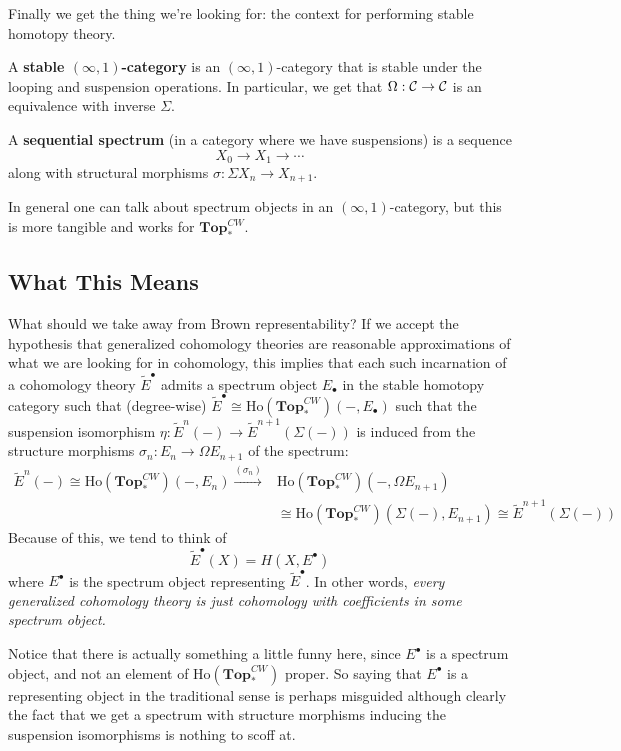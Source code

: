 \documentclass[12pt]{article}
\newcommand*{\pCW}{\mathbf{Top}^{CW}_\ast}
\begin{document}
Finally we get the thing we're looking for: the context for performing stable homotopy theory.
\begin{defn}
	A \textbf{stable $(\infty,1)$-category} is an $(\infty,1)$-category that is stable under the looping and suspension operations. In particular, 
	we get that $\Omega:\mathcal{C}\to\mathcal{C}$ is an equivalence with inverse $\Sigma.$
\end{defn}
\begin{defn}
	A \textbf{sequential spectrum} (in a category where we have suspensions) is a sequence 
	\[X_0\to X_1\to\cdots\]
	along with structural morphisms $\sigma:\Sigma X_n\to X_{n+1}$.
\end{defn}
\begin{rmk}
	In general one can talk about spectrum objects in an $(\infty,1)$-category, but this is more tangible and works for $\pCW$.
\end{rmk}

\subsection{What This Means}
What should we take away from Brown representability? If we accept the hypothesis that generalized cohomology 
theories are reasonable approximations of what we are looking for in cohomology, this implies that each such 
incarnation of a cohomology theory $\tilde E^\bullet$ admits a spectrum object $E_\bullet$ in the stable homotopy category 
such that (degree-wise) $\tilde E^\bullet\cong \text{Ho}(\pCW)(-,E_\bullet)$ such that the suspension isomorphism 
$\eta:\tilde E^n(-)\to \tilde E^{n+1}(\Sigma(-))$ is induced from the structure morphisms $\sigma_n:E_n\to\Omega E_{n+1}$ of the spectrum:
\begin{align*}
	\tilde E^n(-)\cong \text{Ho}(\pCW)(-,E_n)\xrightarrow{(\sigma_n)}&\text{Ho}(\pCW)(-,\Omega E_{n+1})\\
	&\cong\text{Ho}(\pCW)(\Sigma(-),E_{n+1})\cong \tilde E^{n+1}(\Sigma(-))
\end{align*}
Because of this, we tend to think of 
\[\tilde E^\bullet(X)=H(X,E^\bullet)\]
where $E^\bullet$ is the spectrum object representing $\tilde E^\bullet$. In other words, \textit{every generalized cohomology theory is just 
cohomology with coefficients in some spectrum object.}
\begin{rmk}
	Notice that there is actually something a little funny here, since $E^\bullet$ is a spectrum object, and not an element of $\text{Ho}(\pCW)$ proper.
	So saying that $E^\bullet$ is a representing object in the traditional sense is perhaps misguided although clearly the fact that we get a 
	spectrum with structure morphisms inducing the suspension isomorphisms is nothing to scoff at.
\end{rmk}
\end{document}
